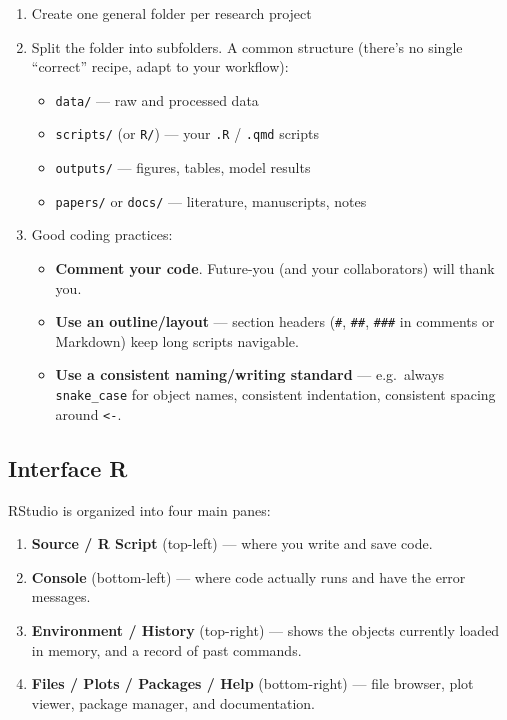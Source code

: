 \documentclass[
  letterpaper,
  DIV=11,
  numbers=noendperiod]{scrartcl}
\providecommand{\tightlist}{%
  \setlength{\itemsep}{0pt}\setlength{\parskip}{0pt}}
\begin{document}
\begin{enumerate}
\def\labelenumi{\arabic{enumi}.}
\tightlist
\item
  Create one general folder per research project
\item
  Split the folder into subfolders. A common structure (there's no
  single ``correct'' recipe, adapt to your workflow):

  \begin{itemize}
  \tightlist
  \item
    \texttt{data/} --- raw and processed data
  \item
    \texttt{scripts/} (or \texttt{R/}) --- your \texttt{.R} /
    \texttt{.qmd} scripts
  \item
    \texttt{outputs/} --- figures, tables, model results
  \item
    \texttt{papers/} or \texttt{docs/} --- literature, manuscripts,
    notes
  \end{itemize}
\item
  Good coding practices:

  \begin{itemize}
  \tightlist
  \item
    \textbf{Comment your code}. Future-you (and your collaborators) will
    thank you.
  \item
    \textbf{Use an outline/layout} --- section headers (\texttt{\#},
    \texttt{\#\#}, \texttt{\#\#\#} in comments or Markdown) keep long
    scripts navigable.
  \item
    \textbf{Use a consistent naming/writing standard} --- e.g.~always
    \texttt{snake\_case} for object names, consistent indentation,
    consistent spacing around \texttt{\textless{}-}.
  \end{itemize}
\end{enumerate}

\subsection{Interface R}\label{interface-r}

RStudio is organized into four main panes:

\begin{enumerate}
\def\labelenumi{\arabic{enumi}.}
\tightlist
\item
  \textbf{Source / R Script} (top-left) --- where you write and save
  code.
\item
  \textbf{Console} (bottom-left) --- where code actually runs and have
  the error messages.
\item
  \textbf{Environment / History} (top-right) --- shows the objects
  currently loaded in memory, and a record of past commands.
\item
  \textbf{Files / Plots / Packages / Help} (bottom-right) --- file
  browser, plot viewer, package manager, and documentation.
\end{enumerate}
\end{document}
